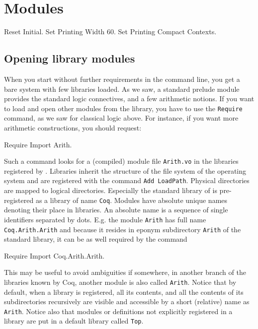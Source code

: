 \documentclass[11pt,a4paper]{book}
\begin{document}
\chapter{Modules}

\begin{coq_eval}
Reset Initial.
Set Printing Width 60.
Set Printing Compact Contexts.
\end{coq_eval}

\section{Opening library modules}

When you start \Coq{} without further requirements in the command line,
you get a bare system with few libraries loaded.  As we saw, a standard
prelude module provides the standard logic connectives, and a few
arithmetic notions. If you want to load and open other modules from
the library, you have to use the \verb"Require" command, as we saw for
classical logic above. For instance, if you want more arithmetic
constructions, you should request:
\begin{coq_example*}
Require Import Arith.
\end{coq_example*}

Such a command looks for a (compiled) module file \verb:Arith.vo: in
the libraries registered by \Coq. Libraries inherit the structure of
the file system of the operating system and are registered with the
command \verb:Add LoadPath:. Physical directories are mapped to
logical directories. Especially the standard library of \Coq{} is
pre-registered as a library of name \verb=Coq=.  Modules have absolute
unique names denoting their place in \Coq{} libraries.  An absolute
name is a sequence of single identifiers separated by dots.  E.g. the
module \verb=Arith= has full name \verb=Coq.Arith.Arith= and because
it resides in eponym subdirectory \verb=Arith= of the standard
library, it can be as well required by the command

\begin{coq_example*}
Require Import Coq.Arith.Arith.
\end{coq_example*}

This may be useful to avoid ambiguities if somewhere, in another branch
of the libraries known by Coq, another module is also called
\verb=Arith=. Notice that by default, when a library is registered,
all its contents, and all the contents of its subdirectories recursively are
visible and accessible by a short (relative) name as \verb=Arith=.
Notice also that modules or definitions not explicitly registered in
a library are put in a default library called \verb=Top=.
\end{document}
